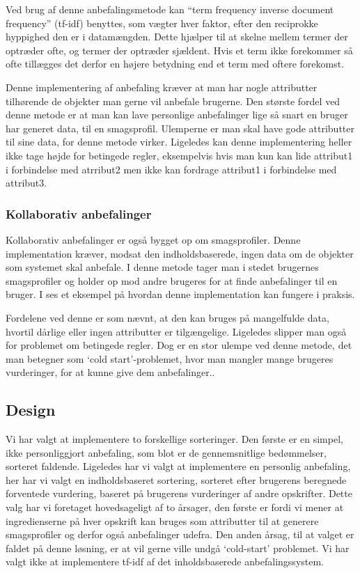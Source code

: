 Ved brug af denne anbefalingsmetode kan ``term frequency inverse document frequency'' (tf-idf) benyttes, som vægter hver faktor, efter den reciprokke hyppighed den er i datamængden.
Dette hjælper til at skelne mellem termer der optræder ofte, og termer der optræder sjældent.
Hvis et term ikke forekommer så ofte tillægges det derfor en højere betydning end et term med oftere forekomst.

Denne implementering af anbefaling kræver at man har nogle attributter tilhørende de objekter man gerne vil anbefale brugerne.
Den største fordel ved denne metode  er at man kan lave personlige anbefalinger lige så snart en bruger har generet data, til en smagsprofil.
Ulemperne er man skal have gode attributter til sine data, for denne metode virker. 
Ligeledes kan denne implementering heller ikke tage højde for betingede regler, eksempelvis hvis man kun kan lide attribut1 i forbindelse med atrribut2 men ikke kan fordrage attribut1 i forbindelse med attribut3.

\subsubsection{Kollaborativ anbefalinger}
Kollaborativ anbefalinger er også bygget op om smagsprofiler.
Denne implementation kræver, modsat den indholdsbaserede, ingen data om de objekter som systemet skal anbefale. 
I denne metode tager man i stedet brugernes smagsprofiler og holder op mod andre brugeres for at finde anbefalinger til en bruger.
I  ses et eksempel på hvordan denne implementation kan fungere i praksis.

Fordelene ved denne er som nævnt, at den kan bruges på mangelfulde data, hvortil dårlige eller ingen attributter er tilgængelige.
Ligeledes slipper man også for problemet om betingede regler.
Dog er en stor ulempe ved denne metode, det man betegner som ‘cold start’-problemet, hvor man mangler mange brugeres vurderinger, for at kunne give dem anbefalinger.\citep{RecommenderSystems}.


\subsection{Design}
Vi har valgt at implementere to forskellige sorteringer.
Den første er en simpel, ikke personliggjort anbefaling, som blot er de gennemsnitlige bedømmelser, sorteret faldende.
Ligeledes har vi valgt at implementere en personlig anbefaling, her har vi valgt en indholdsbaseret sortering, sorteret efter brugerens beregnede forventede vurdering, baseret på brugerens vurderinger af andre opskrifter.
Dette valg har vi foretaget hovedsageligt af to årsager, den første er fordi vi mener at ingredienserne på hver opskrift kan bruges som attributter til at generere smagsprofiler og derfor også anbefalinger udefra.
Den anden årsag, til at valget er faldet på denne løsning, er at vil gerne ville undgå ‘cold-start’ problemet.
Vi har valgt ikke at implementere tf-idf af det inholdsbaserede anbefalingssystem.

